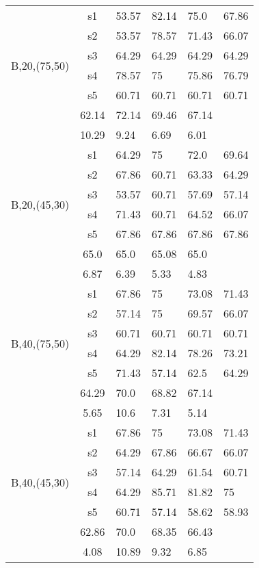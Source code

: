 \begin{table}[h]
{\begin{tabular}{cc|llll}
\multirow{6}{*}{\begin{sideways}B,20,(75,50)\end{sideways}} & s1 & 53.57 & 82.14 & 75.0 & 67.86 \\
 & s2 & 53.57 & 78.57 & 71.43 & 66.07 \\
 & s3 & 64.29 & 64.29 & 64.29 & 64.29 \\
 & s4 & 78.57 & 75 & 75.86 & 76.79 \\
 & s5 & 60.71 & 60.71 & 60.71 & 60.71 \\
\rowcolor{lightgray!50}\multicolumn{2}{r|}{avg} & 62.14 & 72.14 & 69.46 & 67.14 \\
\rowcolor{lightgray!50}\multicolumn{2}{r|}{std} & 10.29 & 9.24 & 6.69 & 6.01 \\
\multirow{6}{*}{\begin{sideways}B,20,(45,30)\end{sideways}} & s1 & 64.29 & 75 & 72.0 & 69.64 \\
 & s2 & 67.86 & 60.71 & 63.33 & 64.29 \\
 & s3 & 53.57 & 60.71 & 57.69 & 57.14 \\
 & s4 & 71.43 & 60.71 & 64.52 & 66.07 \\
 & s5 & 67.86 & 67.86 & 67.86 & 67.86 \\
\rowcolor{lightgray!50}\multicolumn{2}{r|}{avg} & 65.0 & 65.0 & 65.08 & 65.0 \\
\rowcolor{lightgray!50}\multicolumn{2}{r|}{std} & 6.87 & 6.39 & 5.33 & 4.83 \\
\multirow{6}{*}{\begin{sideways}B,40,(75,50)\end{sideways}} & s1 & 67.86 & 75 & 73.08 & 71.43 \\
 & s2 & 57.14 & 75 & 69.57 & 66.07 \\
 & s3 & 60.71 & 60.71 & 60.71 & 60.71 \\
 & s4 & 64.29 & 82.14 & 78.26 & 73.21 \\
 & s5 & 71.43 & 57.14 & 62.5 & 64.29 \\
\rowcolor{lightgray!50}\multicolumn{2}{r|}{avg} & 64.29 & 70.0 & 68.82 & 67.14 \\
\rowcolor{lightgray!50}\multicolumn{2}{r|}{std} & 5.65 & 10.6 & 7.31 & 5.14 \\
\multirow{6}{*}{\begin{sideways}B,40,(45,30)\end{sideways}} & s1 & 67.86 & 75 & 73.08 & 71.43 \\
 & s2 & 64.29 & 67.86 & 66.67 & 66.07 \\
 & s3 & 57.14 & 64.29 & 61.54 & 60.71 \\
 & s4 & 64.29 & 85.71 & 81.82 & 75 \\
 & s5 & 60.71 & 57.14 & 58.62 & 58.93 \\
\rowcolor{lightgray!50}\multicolumn{2}{r|}{avg} & 62.86 & 70.0 & 68.35 & 66.43 \\
\rowcolor{lightgray!50}\multicolumn{2}{r|}{std} & 4.08 & 10.89 & 9.32 & 6.85
\end{tabular}}
\end{table}

